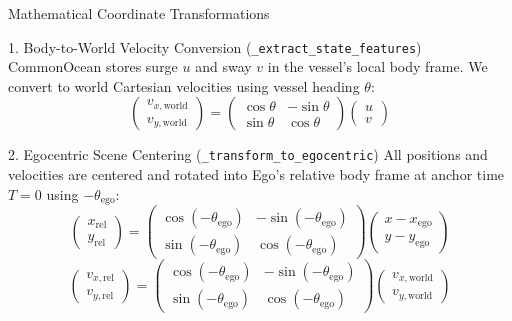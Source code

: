 \documentclass[t]{beamer}
\begin{document}
\begin{frame}{Mathematical Coordinate Transformations}
    \begin{block}{1. Body-to-World Velocity Conversion (\texttt{\_extract\_state\_features})}
        CommonOcean stores surge $u$ and sway $v$ in the vessel's local body frame. We convert to world Cartesian velocities using vessel heading $\theta$:
        $$\begin{pmatrix} v_{x,\mathrm{world}} \\ v_{y,\mathrm{world}} \end{pmatrix} = \begin{pmatrix} \cos\theta & -\sin\theta \\ \sin\theta & \cos\theta \end{pmatrix} \begin{pmatrix} u \\ v \end{pmatrix}$$
    \end{block}

    \begin{block}{2. Egocentric Scene Centering (\texttt{\_transform\_to\_egocentric})}
        All positions and velocities are centered and rotated into Ego's relative body frame at anchor time $T=0$ using $-\theta_{\mathrm{ego}}$:
        $$\begin{pmatrix} x_{\mathrm{rel}} \\ y_{\mathrm{rel}} \end{pmatrix} = \begin{pmatrix} \cos(-\theta_{\mathrm{ego}}) & -\sin(-\theta_{\mathrm{ego}}) \\ \sin(-\theta_{\mathrm{ego}}) & \cos(-\theta_{\mathrm{ego}}) \end{pmatrix} \begin{pmatrix} x - x_{\mathrm{ego}} \\ y - y_{\mathrm{ego}} \end{pmatrix}$$
        $$\begin{pmatrix} v_{x,\mathrm{rel}} \\ v_{y,\mathrm{rel}} \end{pmatrix} = \begin{pmatrix} \cos(-\theta_{\mathrm{ego}}) & -\sin(-\theta_{\mathrm{ego}}) \\ \sin(-\theta_{\mathrm{ego}}) & \cos(-\theta_{\mathrm{ego}}) \end{pmatrix} \begin{pmatrix} v_{x,\mathrm{world}} \\ v_{y,\mathrm{world}} \end{pmatrix}$$
    \end{block}
\end{frame}
\end{document}
